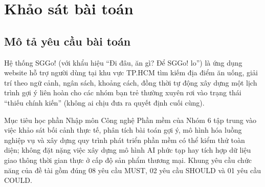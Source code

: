 \documentclass[13pt,a4paper]{extreport}
\begin{document}

\chapter{Khảo sát bài toán}

\section{Mô tả yêu cầu bài toán}

Hệ thống SGGo! (với khẩu hiệu ``Đi đâu, ăn gì? Để SGGo! lo'') là ứng dụng website hỗ trợ người dùng tại khu vực TP.HCM tìm kiếm địa điểm ăn uống, giải trí theo ngữ cảnh, ngân sách, khoảng cách, đồng thời tự động xây dựng một lịch trình gợi ý liên hoàn cho các nhóm bạn trẻ thường xuyên rơi vào trạng thái ``thiếu chính kiến'' (không ai chịu đưa ra quyết định cuối cùng).

Mục tiêu học phần Nhập môn Công nghệ Phần mềm của Nhóm 6 tập trung vào việc khảo sát bối cảnh thực tế, phân tích bài toán gợi ý, mô hình hóa luồng nghiệp vụ và xây dựng quy trình phát triển phần mềm có thể kiểm thử toàn diện; không đặt nặng việc xây dựng mô hình AI phức tạp hay tích hợp dữ liệu giao thông thời gian thực ở cấp độ sản phẩm thương mại. Khung yêu cầu chức năng của đề tài gồm đúng 08 yêu cầu MUST, 02 yêu cầu SHOULD và 01 yêu cầu COULD.
\end{document}
